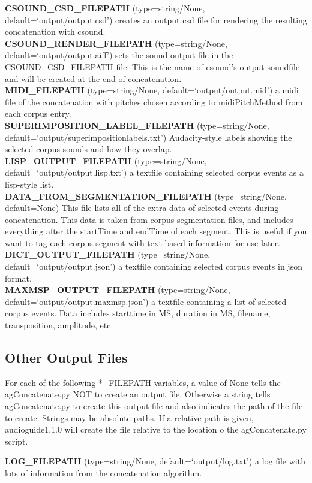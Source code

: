 \documentclass{article}
\newcommand{\optEntry}[4]{\textbf{#1} (type={\color{red}#2}, default={\color{ForestGreen}#3}) #4\hspace{0.5em}\\}
\newcommand{\ag}{audioguide1.1.0\xspace}
\begin{document}
\begin{spacing}{1.2}
\optEntry{CSOUND\_CSD\_FILEPATH}{string/None}{`output/output.csd'}{creates an output csd file for rendering the resulting concatenation with csound.}

\optEntry{CSOUND\_RENDER\_FILEPATH}{string/None}{`output/output.aiff'}{sets the sound output file in the CSOUND\_CSD\_FILEPATH file.  This is the name of csound's output soundfile and will be created at the end of concatenation.}

\optEntry{MIDI\_FILEPATH}{string/None}{`output/output.mid'}{a midi file of the concatenation with pitches chosen according to midiPitchMethod from each corpus entry.}

\optEntry{SUPERIMPOSITION\_LABEL\_FILEPATH}{string/None}{`output/superimpositionlabels.txt'}{Audacity-style labels showing the selected corpus sounds and how they overlap.}

\optEntry{LISP\_OUTPUT\_FILEPATH}{string/None}{`output/output.lisp.txt'}{a textfile containing selected corpus events as a lisp-style list.}

\optEntry{DATA\_FROM\_SEGMENTATION\_FILEPATH}{string/None}{None}{This file lists all of the extra data of selected events during concatenation.  This data is taken from corpus segmentation files, and includes everything after the startTime and endTime of each segment.  This is useful if you want to tag each corpus segment with text based information for use later.}

\optEntry{DICT\_OUTPUT\_FILEPATH}{string/None}{`output/output.json'}{a textfile containing selected corpus events in json format.}

\optEntry{MAXMSP\_OUTPUT\_FILEPATH}{string/None}{`output/output.maxmsp.json'}{a textfile containing a list of selected corpus events.  Data includes starttime in MS, duration in MS, filename, transposition, amplitude, etc.}


\subsection{Other Output Files}\label{otheroutputfiles}
For each of the following *\_FILEPATH variables, a value of None tells the agConcatenate.py NOT to create an output file.  Otherwise a string tells agConcatenate.py to create this output file and also indicates the path of the file to create.  Strings may be absolute paths.  If a relative path is given, \ag will create the file relative to the location o the agConcatenate.py script.

\optEntry{LOG\_FILEPATH}{string/None}{`output/log.txt'}{a log file with lots of information from the concatenation algorithm.}


\end{spacing}
\end{document}

